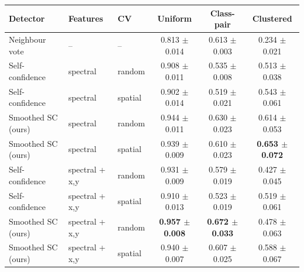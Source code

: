 \begin{tabular}{lll ccc}
\toprule
Detector & Features & CV & Uniform & Class-pair & Clustered \\
\midrule
Neighbour vote & -- & -- & 0.813 $\pm$ 0.014 & 0.613 $\pm$ 0.003 & 0.234 $\pm$ 0.021 \\
Self-confidence & spectral & random & 0.908 $\pm$ 0.011 & 0.535 $\pm$ 0.008 & 0.513 $\pm$ 0.038 \\
Self-confidence & spectral & spatial & 0.902 $\pm$ 0.014 & 0.519 $\pm$ 0.021 & 0.543 $\pm$ 0.061 \\
Smoothed SC (ours) & spectral & random & 0.944 $\pm$ 0.011 & 0.630 $\pm$ 0.023 & 0.614 $\pm$ 0.053 \\
Smoothed SC (ours) & spectral & spatial & 0.939 $\pm$ 0.009 & 0.610 $\pm$ 0.023 & \textbf{0.653 $\pm$ 0.072} \\
Self-confidence & spectral + x,y & random & 0.931 $\pm$ 0.009 & 0.579 $\pm$ 0.019 & 0.427 $\pm$ 0.045 \\
Self-confidence & spectral + x,y & spatial & 0.910 $\pm$ 0.013 & 0.523 $\pm$ 0.019 & 0.519 $\pm$ 0.061 \\
Smoothed SC (ours) & spectral + x,y & random & \textbf{0.957 $\pm$ 0.008} & \textbf{0.672 $\pm$ 0.033} & 0.478 $\pm$ 0.063 \\
Smoothed SC (ours) & spectral + x,y & spatial & 0.940 $\pm$ 0.007 & 0.607 $\pm$ 0.025 & 0.588 $\pm$ 0.067 \\
\bottomrule
\end{tabular}